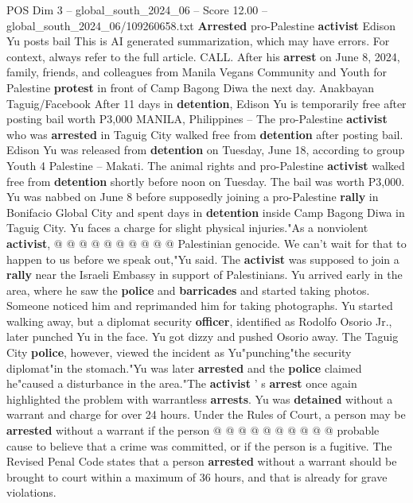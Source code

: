 \begin{textsample}{POS Dim 3 – global\_south\_2024\_06 – Score 12.00 – global\_south\_2024\_06/109260658.txt}  \label{ex:f3_pos_339}
\textbf{Arrested} pro-Palestine \textbf{activist} Edison Yu posts bail This is AI generated summarization, which may have errors.
For context, always refer to the full article.
CALL.
After his \textbf{arrest} on June 8, 2024, family, friends, and colleagues from Manila Vegans Community and Youth for Palestine \textbf{protest} in front of Camp Bagong Diwa the next day.
Anakbayan Taguig/Facebook After 11 days in \textbf{detention}, Edison Yu is temporarily free after posting bail worth P3,000 MANILA, Philippines -- The pro-Palestine \textbf{activist} who was \textbf{arrested} in Taguig City walked free from \textbf{detention} after posting bail.
Edison Yu was released from \textbf{detention} on Tuesday, June 18, according to group Youth 4 Palestine -- Makati.
The animal rights and pro-Palestine \textbf{activist} walked free from \textbf{detention} shortly before noon on Tuesday.
The bail was worth P3,000.
Yu was nabbed on June 8 before supposedly joining a pro-Palestine \textbf{rally} in Bonifacio Global City and spent days in \textbf{detention} inside Camp Bagong Diwa in Taguig City.
Yu faces a charge for slight physical injuries."As a nonviolent \textbf{activist}, @ @ @ @ @ @ @ @ @ @ Palestinian genocide.
We can't wait for that to happen to us before we speak out,"Yu said.
The \textbf{activist} was supposed to join a \textbf{rally} near the Israeli Embassy in support of Palestinians.
Yu arrived early in the area, where he saw the \textbf{police} and \textbf{barricades} and started taking photos.
Someone noticed him and reprimanded him for taking photographs.
Yu started walking away, but a diplomat security \textbf{officer}, identified as Rodolfo Osorio Jr., later punched Yu in the face.
Yu got dizzy and pushed Osorio away.
The Taguig City \textbf{police}, however, viewed the incident as Yu"punching"the security diplomat"in the stomach."Yu was later \textbf{arrested} and the \textbf{police} claimed he"caused a disturbance in the area."The \textbf{activist} ' s \textbf{arrest} once again highlighted the problem with warrantless \textbf{arrests}.
Yu was \textbf{detained} without a warrant and charge for over 24 hours.
Under the Rules of Court, a person may be \textbf{arrested} without a warrant if the person @ @ @ @ @ @ @ @ @ @ probable cause to believe that a crime was committed, or if the person is a fugitive.
The Revised Penal Code states that a person \textbf{arrested} without a warrant should be brought to court within a maximum of 36 hours, and that is already for grave violations.

\end{textsample}
